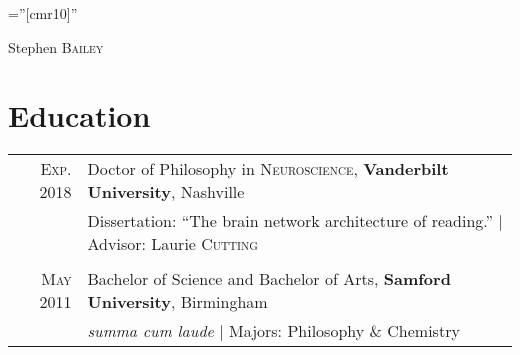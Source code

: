 \documentclass[a4paper,10pt]{article}
\begin{document}

\pagestyle{empty} %

\font\fb=''[cmr10]'' %

\par{\centering
		{\Huge Stephen \textsc{Bailey}
	}\\ \medskip}


\section{Education}
\begin{tabular}{rl}	

    \textsc{Exp.} 2018 & Doctor of Philosophy in \textsc{Neuroscience}, \textbf{Vanderbilt University}, Nashville\\
    & Dissertation: ``The brain network architecture of reading.'' | \small Advisor: Laurie \textsc{Cutting}\\\\
    
    \textsc{May} 2011 & Bachelor of Science and Bachelor of Arts, \textbf{Samford University}, Birmingham\\
    & \small\emph{summa cum laude} | Majors: Philosophy \& Chemistry\\

\end{tabular}


\end{document}
